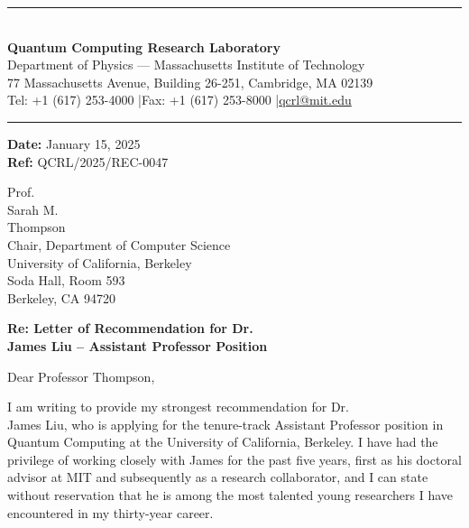 \documentclass[12pt,a4paper]{article}
\begin{document}
\begin{center}
{\color{headercolor}\rule{\textwidth}{2pt}}\\[12pt]
{\fontsize{20}{24}\selectfont\bfseries\color{headercolor} Quantum Computing Research Laboratory}\\[4pt]
{\large Department of Physics --- Massachusetts Institute of Technology}\\[4pt]
{\small 77 Massachusetts Avenue, Building 26-251, Cambridge, MA 02139}\\[2pt]
{\small Tel: +1 (617) 253-4000 \quad|\quad Fax: +1 (617) 253-8000 \quad|\quad \href{mailto:qcrl@mit.edu}{qcrl@mit.edu}}\\[8pt]
{\color{headercolor}\rule{\textwidth}{0.5pt}}
\end{center}

\vspace{1cm}

\begin{flushright}
\textbf{Date:} January 15, 2025\\
\textbf{Ref:} QCRL/2025/REC-0047
\end{flushright}

\vspace{0.5cm}

Prof.\\ Sarah M.\\ Thompson\\
Chair, Department of Computer Science\\
University of California, Berkeley\\
Soda Hall, Room 593\\
Berkeley, CA 94720

\vspace{0.5cm}

\textbf{Re: Letter of Recommendation for Dr.\\ James Liu -- Assistant Professor Position}

\vspace{0.3cm}

Dear Professor Thompson,

I am writing to provide my strongest recommendation for Dr.\\ James Liu, who is applying for the tenure-track Assistant Professor position in Quantum Computing at the University of California, Berkeley. I have had the privilege of working closely with James for the past five years, first as his doctoral advisor at MIT and subsequently as a research collaborator, and I can state without reservation that he is among the most talented young researchers I have encountered in my thirty-year career.
\end{document}
